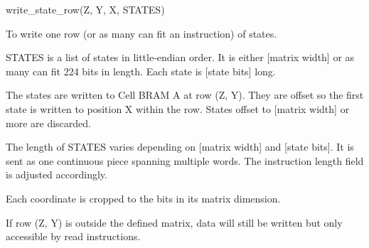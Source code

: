 

\format
write\_state\_row(Z, Y, X, STATES)

\purpose

To write one row (or as many can fit an instruction) of states.

\description

STATES is a list of states in little-endian order.
It is either [matrix width] or as many can fit 224 bits in length.
Each state is [state bits] long.

The states are written to Cell BRAM A at row (Z, Y).
They are offset so the first state is written to position X within the row.
States offset to [matrix width] or more are discarded.

The length of STATES varies depending on [matrix width] and [state bits].
It is sent as one continuous piece spanning multiple words.
The instruction length field is adjusted accordingly.

\notes

Each coordinate is cropped to the bits in its matrix dimension.

If row (Z, Y) is outside the defined matrix, data will still be written but only accessible by read instructions.
